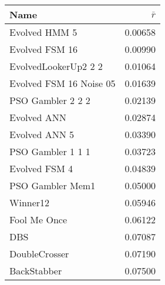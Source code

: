 \begin{tabular}{lr}
\toprule
Name                    &   $\bar{r}$                        \\
\midrule
Evolved HMM 5           &                            0.00658 \\
Evolved FSM 16          &                            0.00990 \\
EvolvedLookerUp2 2 2    &                            0.01064 \\
Evolved FSM 16 Noise 05 &                            0.01639 \\
PSO Gambler 2 2 2       &                            0.02139 \\
Evolved ANN             &                            0.02874 \\
Evolved ANN 5           &                            0.03390 \\
PSO Gambler 1 1 1       &                            0.03723 \\
Evolved FSM 4           &                            0.04839 \\
PSO Gambler Mem1        &                            0.05000 \\
Winner12                &                            0.05946 \\
Fool Me Once            &                            0.06122 \\
DBS                     &                            0.07087 \\
DoubleCrosser           &                            0.07190 \\
BackStabber             &                            0.07500 \\
\bottomrule
\end{tabular}
